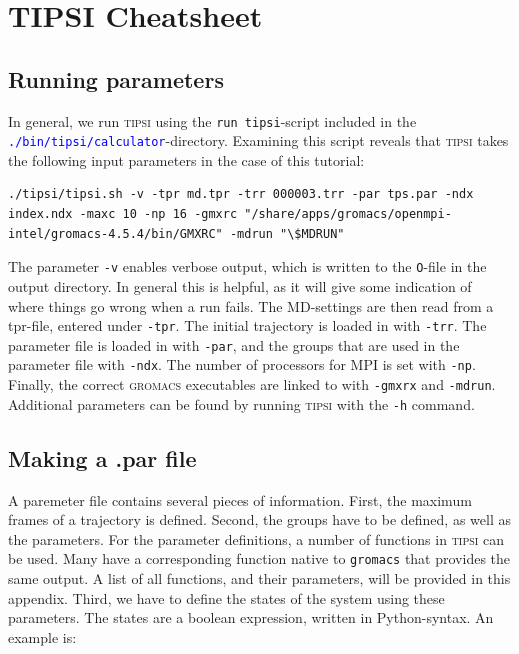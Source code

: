 \documentclass[]{article}
\begin{document}
\newpage
\section*{TIPSI Cheatsheet}

\subsection*{Running parameters}

In general, we run \textsc{tipsi} using the \texttt{run tipsi}-script included in the \textcolor{blue}{\texttt{./bin/tipsi/calculator}}-directory. 
Examining this script reveals that \textsc{tipsi} takes the following input parameters in the case of this tutorial:

\begin{lstlisting}
./tipsi/tipsi.sh -v -tpr md.tpr -trr 000003.trr -par tps.par -ndx index.ndx -maxc 10 -np 16 -gmxrc "/share/apps/gromacs/openmpi-intel/gromacs-4.5.4/bin/GMXRC" -mdrun "\$MDRUN"
\end{lstlisting}

The parameter \texttt{-v} enables verbose output, which is written to the \texttt{O}-file in the output directory. 
In general this is helpful, as it will give some indication of where things go wrong when a run fails. 
The MD-settings are then read from a tpr-file, entered under \texttt{-tpr}. 
The initial trajectory is loaded in with \texttt{-trr}. 
The parameter file is loaded in with \texttt{-par}, and the groups that are used in the parameter file with \texttt{-ndx}. 
The number of processors for MPI is set with \texttt{-np}. 
Finally, the correct \textsc{gromacs} executables are linked to with \texttt{-gmxrx} and \texttt{-mdrun}.
Additional parameters can be found by running \textsc{tipsi} with the \texttt{-h} command.

\subsection*{Making a .par file}

A paremeter file contains several pieces of information. First, the maximum frames of a trajectory is defined. 
Second, the groups have to be defined, as well as the parameters. 
For the parameter definitions, a number of functions in \textsc{tipsi} can be used. 
Many have a corresponding function native to \texttt{gromacs} that provides the same output. 
A list of all functions, and their parameters, will be provided in this appendix. 
Third, we have to define the states of the system using these parameters.
The states are a boolean expression, written in Python-syntax. An example is:
\end{document}
